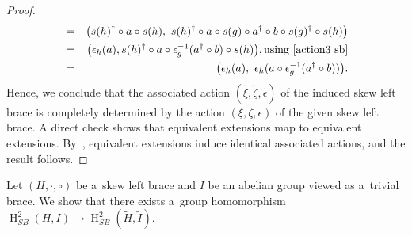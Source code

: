 \documentclass{jonasart}
\theoremstyle{plain}
\DeclareMathOperator{\Ho}{H}
\begin{document}
\begin{proof}
\begin{eqnarray}
			&=&\big(s(h)^\dagger\circ a\circ s(h),~s(h)^\dagger\circ a\circ s(g)\circ a^\dagger\circ b\circ s(g)^\dagger \circ s(h)\big)\nonumber\\
			&=&\big(\epsilon_h (a),s(h)^\dagger\circ a\circ \epsilon^{-1}_g (a^\dagger \circ b) \circ s(h)\big), \text{using~\eqref{action3 sb}}\nonumber\\
			&=&\big(\epsilon_h (a),~\epsilon_h (a\circ \epsilon^{-1}_g (a^\dagger\circ b))\big).\label{tilde epsilon}
		\end{eqnarray}
		Hence, we conclude that the associated action $(\widetilde{\xi},\widetilde{\zeta},\widetilde{\epsilon})$ of the induced skew left brace is completely determined by the action $(\xi,\zeta,\epsilon)$ of the given skew left brace. A direct check shows that equivalent extensions map to equivalent extensions. By~\cite[Proposition 3.4]{MR4604853}, equivalent extensions induce identical associated actions, and the result follows.
	\end{proof}
	
	Let $(H,\cdot,\circ)$ be a~skew left brace and $I$ be an abelian group viewed as a~trivial brace. We show that there exists a~group homomorphism $\Ho^2_{SB}(H,I)\to\Ho^2_{SB}(\widetilde{H},\widetilde{I})$.
	
\end{document}
